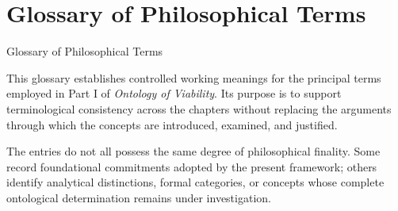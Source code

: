 %
%
%



\chapter*{Glossary of Philosophical Terms}
         {Glossary of Philosophical Terms}

This glossary establishes controlled working meanings for the principal
terms employed in Part I of \textit{Ontology of Viability}.
Its purpose is to support terminological consistency across the chapters
without replacing the arguments through which the concepts are introduced,
examined, and justified.

The entries do not all possess the same degree of philosophical finality.
Some record foundational commitments adopted by the present framework;
others identify analytical distinctions, formal categories, or concepts
whose complete ontological determination remains under investigation.

